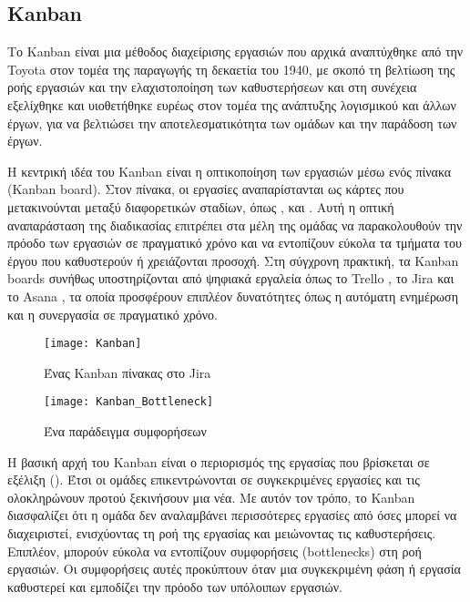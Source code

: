         \subsection{Kanban}
            Το Kanban είναι μια μέθοδος διαχείρισης εργασιών που αρχικά αναπτύχθηκε από την Toyota στον τομέα της παραγωγής τη δεκαετία του 1940, με σκοπό τη βελτίωση της ροής εργασιών και την ελαχιστοποίηση των καθυστερήσεων και στη συνέχεια εξελίχθηκε και υιοθετήθηκε ευρέως στον τομέα της ανάπτυξης λογισμικού και άλλων έργων, για να βελτιώσει την αποτελεσματικότητα των ομάδων και την παράδοση των έργων.

            Η κεντρική ιδέα του Kanban είναι η οπτικοποίηση των εργασιών μέσω ενός πίνακα (Kanban board). Στον πίνακα, οι εργασίες αναπαρίστανται ως κάρτες που μετακινούνται μεταξύ διαφορετικών σταδίων, όπως ,  και . Αυτή η οπτική αναπαράσταση της διαδικασίας επιτρέπει στα μέλη της ομάδας να παρακολουθούν την πρόοδο των εργασιών σε πραγματικό χρόνο και να εντοπίζουν εύκολα τα τμήματα του έργου που καθυστερούν ή χρειάζονται προσοχή. Στη σύγχρονη πρακτική, τα Kanban boards συνήθως υποστηρίζονται από ψηφιακά εργαλεία όπως το Trello \cite{Trello}, το Jira \cite{Jira} και το Asana \cite{Asana}, τα οποία προσφέρουν επιπλέον δυνατότητες όπως η αυτόματη ενημέρωση και η συνεργασία σε πραγματικό χρόνο.

            \begin{figure}[h!] \noindent \centering
                \texttt{[image: Kanban]}
                \caption{Ένας Kanban πίνακας στο Jira}
            \end{figure}

            \begin{figure}[h!] \noindent \centering
                \texttt{[image: Kanban\_Bottleneck]}
                \caption{Ένα παράδειγμα συμφορήσεων \cite{Agile_Stellman}}
            \end{figure}

            Η βασική αρχή του Kanban είναι ο περιορισμός της εργασίας που βρίσκεται σε εξέλιξη (). Έτσι οι ομάδες επικεντρώνονται σε συγκεκριμένες εργασίες και τις ολοκληρώνουν προτού ξεκινήσουν μια νέα. Με αυτόν τον τρόπο, το Kanban διασφαλίζει ότι η ομάδα δεν αναλαμβάνει περισσότερες εργασίες από όσες μπορεί να διαχειριστεί, ενισχύοντας τη ροή της εργασίας και μειώνοντας τις καθυστερήσεις. Επιπλέον, μπορούν εύκολα να εντοπίζουν συμφορήσεις (bottlenecks) στη ροή εργασιών. Οι συμφορήσεις αυτές προκύπτουν όταν μια συγκεκριμένη φάση ή εργασία καθυστερεί και εμποδίζει την πρόοδο των υπόλοιπων εργασιών.

